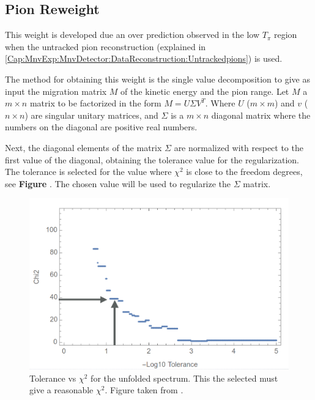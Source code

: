 \subsection{Pion Reweight }
\label{Cap:Simulation:MnvGENIETunes:PionReweight}

This weight is developed due an over prediction observed in the low $T_\pi$ region when the untracked pion reconstruction (explained in \ref{Cap:MnvExp:MnvDetector:DataReconstruction:Untrackedpions}) is used.

The method for obtaining this weight is the single value decomposition to give as input the migration matrix $M$ of the kinetic energy and the pion range. Let $M$ a $m\times n$ matrix to be factorized in the form $M=U\Sigma V^T$. Where $U$ ($m\times m$) and $v$ ($n\times n$) are singular unitary matrices, and $\Sigma$ is a $m\times n$ diagonal matrix where the numbers on the diagonal are positive real numbers. 

Next, the diagonal elements of the matrix $\Sigma$ are normalized with respect to the first value of the diagonal, obtaining the tolerance value for the regularization. The tolerance is selected for the value where $\chi^2$ is close to the freedom degrees, see \textbf{Figure} . The chosen value will be used to regularize the $\Sigma$ matrix.

\begin{figure}[!htb]
    \centering
    \includegraphics[scale=0.3]{Figures/Chapter3/ToleranceTpiweight.png}
    \caption{Tolerance vs $\chi^2$ for the unfolded spectrum. This the selected must give a reasonable $\chi^2$. Figure taken from \cite{PionReweight}.}
    \label{fig:Simulation:MnvGENIETunes:PionReweight:ToleranceTpiWeight}
\end{figure}

